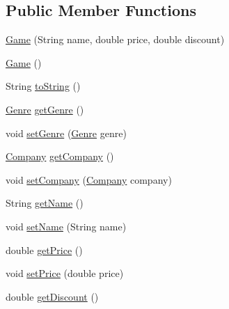 \subsection*{Public Member Functions}
\begin{DoxyCompactItemize}
\item 
\hyperlink{classes_1_1deusto_1_1server_1_1db_1_1data_1_1_game_aad926d06e556453f4b08efa5a3e620d4}{Game} (String name, double price, double discount)
\item 
\hyperlink{classes_1_1deusto_1_1server_1_1db_1_1data_1_1_game_ab1a7af908fc58aef43b6365b9802c850}{Game} ()
\item 
String \hyperlink{classes_1_1deusto_1_1server_1_1db_1_1data_1_1_game_aae9eb6e19b8f730b9554cfac23c8298b}{to\+String} ()
\item 
\hyperlink{classes_1_1deusto_1_1server_1_1db_1_1data_1_1_genre}{Genre} \hyperlink{classes_1_1deusto_1_1server_1_1db_1_1data_1_1_game_a021c30dd22681130bbdb6f2690ba8657}{get\+Genre} ()
\item 
void \hyperlink{classes_1_1deusto_1_1server_1_1db_1_1data_1_1_game_a61d197148280723f018c7ef18e37cb7e}{set\+Genre} (\hyperlink{classes_1_1deusto_1_1server_1_1db_1_1data_1_1_genre}{Genre} genre)
\item 
\hyperlink{classes_1_1deusto_1_1server_1_1db_1_1data_1_1_company}{Company} \hyperlink{classes_1_1deusto_1_1server_1_1db_1_1data_1_1_game_aa772f16e7094839759148d49a4634e82}{get\+Company} ()
\item 
void \hyperlink{classes_1_1deusto_1_1server_1_1db_1_1data_1_1_game_a3699723b19412f250feea6e9c730815c}{set\+Company} (\hyperlink{classes_1_1deusto_1_1server_1_1db_1_1data_1_1_company}{Company} company)
\item 
String \hyperlink{classes_1_1deusto_1_1server_1_1db_1_1data_1_1_game_af9f6defe43d11cefdef169a6aaa87ae7}{get\+Name} ()
\item 
void \hyperlink{classes_1_1deusto_1_1server_1_1db_1_1data_1_1_game_adbbee95debd336c59e90abc168327dc2}{set\+Name} (String name)
\item 
double \hyperlink{classes_1_1deusto_1_1server_1_1db_1_1data_1_1_game_a1b39bf61a9699d6bdd013e48d1159def}{get\+Price} ()
\item 
void \hyperlink{classes_1_1deusto_1_1server_1_1db_1_1data_1_1_game_a255112b41cb22aac11cce60789322d20}{set\+Price} (double price)
\item 
double \hyperlink{classes_1_1deusto_1_1server_1_1db_1_1data_1_1_game_a4c75cd53d5bd16c62804ca3779440165}{get\+Discount} ()
\item 

\end{DoxyCompactItemize}
